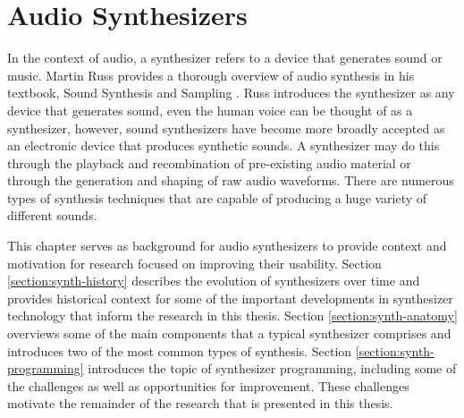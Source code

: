 \chapter{Audio Synthesizers}
\label{chapter:background}

\graphicspath{{./}{./figures/}{./figures/background/}}

In the context of audio, a synthesizer refers to a device that generates sound or music. Martin Russ provides a thorough overview of audio synthesis in his textbook, Sound Synthesis and Sampling \cite{russ2012sound}. Russ introduces the synthesizer as any device that generates sound,  even the human voice can be thought of as a synthesizer, however, sound synthesizers have become more broadly accepted as an electronic device that produces synthetic sounds. A synthesizer may do this through the playback and recombination of pre-existing audio material or through the generation and shaping of raw audio waveforms. There are numerous types of synthesis techniques that are capable of producing a huge variety of different sounds. 


This chapter serves as background for audio synthesizers to provide context and motivation for research focused on improving their usability. Section \ref{section:synth-history} describes the evolution of synthesizers over time and provides historical context for some of the important developments in synthesizer technology that inform the research in this thesis. Section \ref{section:synth-anatomy} overviews some of the main components that a typical synthesizer comprises and introduces two of the most common types of synthesis. Section \ref{section:synth-programming} introduces the topic of synthesizer programming, including some of the challenges as well as opportunities for improvement. These challenges motivate the remainder of the research that is presented in this thesis. 


